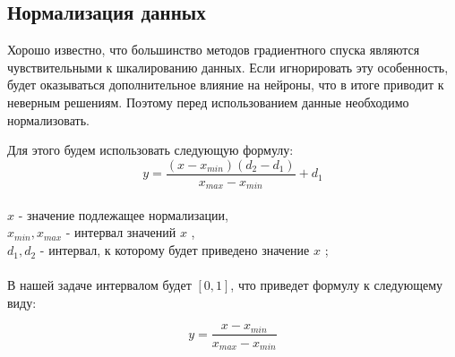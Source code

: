 \subsection{Нормализация данных}
Хорошо известно, что большинство методов градиентного спуска являются чувствительными к шкалированию данных. Если игнорировать эту особенность, будет оказываться дополнительное влияние на нейроны, что в итоге приводит к неверным решениям. Поэтому перед использованием данные необходимо нормализовать. 


Для этого будем использовать следующую формулу:
\\
$$ y=\frac{(x - x_{min})(d_2 - d_1)}{x_{max}-x_{min}}+d_1 $$
\\
$x$ \small - значение подлежащее нормализации, \\
\normalsize $x_{min} , x_{max}$ \small - интервал значений  \normalsize $x$ \small, \\
\normalsize $d_1 , d_2$ \small - интервал, к которому будет приведено значение \normalsize $x$ \small ; \\
\\
\normalsize
В нашей задаче интервалом будет $[0,1]$, что приведет формулу к следующему виду:

$$ y=\frac{x - x_{min}}{x_{max}-x_{min}}$$ 


